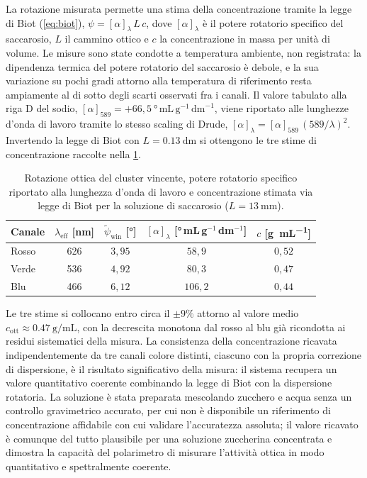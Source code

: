 La rotazione misurata permette una stima della concentrazione tramite la legge di Biot (\cref{eq:biot}), $\psi = [\alpha]_\lambda\,L\,c$, dove $[\alpha]_\lambda$ è il potere rotatorio specifico del saccarosio, $L$ il cammino ottico e $c$ la concentrazione in massa per unità di volume. Le misure sono state condotte a temperatura ambiente, non registrata: la dipendenza termica del potere rotatorio del saccarosio è debole, e la sua variazione su pochi gradi attorno alla temperatura di riferimento resta ampiamente al di sotto degli scarti osservati fra i canali. Il valore tabulato alla riga D del sodio, $[\alpha]_{589} = +66{,}5~\si{\degree}\,\si{\milli\liter}\,\si{\gram}^{-1}\,\si{\deci\meter}^{-1}$, viene riportato alle lunghezze d'onda di lavoro tramite lo stesso scaling di Drude, $[\alpha]_\lambda = [\alpha]_{589}\,(589/\lambda)^2$. Invertendo la legge di Biot con $L = \SI{0.13}{\deci\meter}$ si ottengono le tre stime di concentrazione raccolte nella \cref{tab:zucchero_conc}.

\begin{table}[H]
    \centering
    \caption{Rotazione ottica del cluster vincente, potere rotatorio specifico riportato alla lunghezza d'onda di lavoro e concentrazione stimata via legge di Biot per la soluzione di saccarosio ($L = \SI{13}{\milli\meter}$).}
    \label{tab:zucchero_conc}
    \begin{tabular}{lcccc}
        \hline
        \textbf{Canale} & $\lambda_\mathrm{eff}$ [\si{\nano\meter}] & $\tilde\psi_{\mathrm{win}}$ [\si{\degree}] & $[\alpha]_\lambda$ [\si{\degree}\,\si{\milli\liter}\,\si{\gram}$^{-1}$\,\si{\deci\meter}$^{-1}$] & $c$ [\si{\gram\per\milli\liter}] \\
        \hline
        Rosso & 626 & $3{,}95$ & $58{,}9$  & $0{,}52$ \\
        Verde & 536 & $4{,}92$ & $80{,}3$  & $0{,}47$ \\
        Blu   & 466 & $6{,}12$ & $106{,}2$ & $0{,}44$ \\
        \hline
    \end{tabular}
\end{table}

Le tre stime si collocano entro circa il $\pm 9\%$ attorno al valore medio $c_\mathrm{ott} \approx \SI{0.47}{\gram\per\milli\liter}$, con la decrescita monotona dal rosso al blu già ricondotta ai residui sistematici della misura. La consistenza della concentrazione ricavata indipendentemente da tre canali colore distinti, ciascuno con la propria correzione di dispersione, è il risultato significativo della misura: il sistema recupera un valore quantitativo coerente combinando la legge di Biot con la dispersione rotatoria. La soluzione è stata preparata mescolando zucchero e acqua senza un controllo gravimetrico accurato, per cui non è disponibile un riferimento di concentrazione affidabile con cui validare l'accuratezza assoluta; il valore ricavato è comunque del tutto plausibile per una soluzione zuccherina concentrata e dimostra la capacità del polarimetro di misurare l'attività ottica in modo quantitativo e spettralmente coerente.

